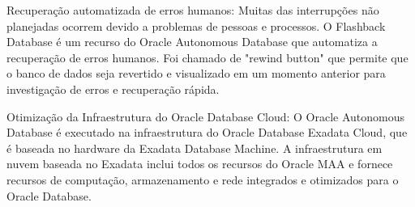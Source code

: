 \begin{alineas}
\item Recuperação automatizada de erros humanos: Muitas das interrupções não planejadas ocorrem devido a problemas de pessoas e processos. O Flashback Database é um recurso do Oracle Autonomous Database que automatiza a recuperação de erros humanos. Foi chamado de "rewind button" que permite que o banco de dados seja revertido e visualizado em um momento anterior para investigação de erros e recuperação rápida.

\item Otimização da Infraestrutura do Oracle Database Cloud: O Oracle Autonomous Database é executado na infraestrutura do Oracle Database Exadata Cloud, que é baseada no hardware da Exadata Database Machine. A infraestrutura em nuvem baseada no Exadata inclui todos os recursos do Oracle MAA e fornece recursos de computação, armazenamento e rede integrados e otimizados para o Oracle Database.
\end{alineas} 


